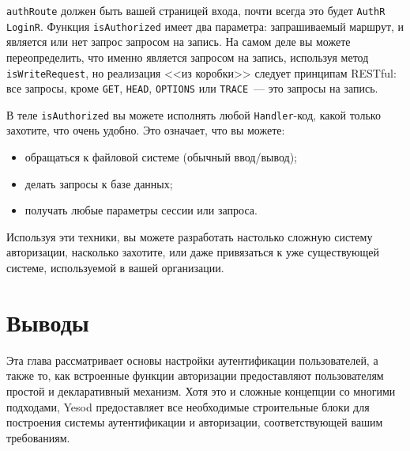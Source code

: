 
\lstinline'authRoute' должен быть вашей страницей входа, почти всегда это будет \lstinline'AuthR LoginR'. Функция \lstinline'isAuthorized' имеет два параметра: запрашиваемый маршрут, и является или нет запрос запросом на запись. На самом деле вы можете переопределить, что именно является запросом на запись, используя метод \lstinline'isWriteRequest', но реализация <<из коробки>> следует принципам RESTful: все запросы, кроме \lstinline'GET', \lstinline'HEAD', \lstinline'OPTIONS' или \lstinline'TRACE'~--- это запросы на запись.

В теле \lstinline'isAuthorized' вы можете исполнять любой \lstinline'Handler'-код, какой только захотите, что очень удобно. Это означает, что вы можете:

\begin{itemize}
    \item обращаться к файловой системе (обычный ввод/вывод);

    \item делать запросы к базе данных;

    \item получать любые параметры сессии или запроса.
\end{itemize}

Используя эти техники, вы можете разработать настолько сложную систему авторизации, насколько захотите, или даже привязаться к уже существующей системе, используемой в вашей организации.

\section{Выводы}

Эта глава рассматривает основы настройки аутентификации пользователей, а также то, как встроенные функции авторизации предоставляют пользователям простой и декларативный механизм. Хотя это и сложные концепции со многими подходами, Yesod предоставляет все необходимые строительные блоки для построения системы аутентификации и авторизации, соответствующей вашим требованиям.
